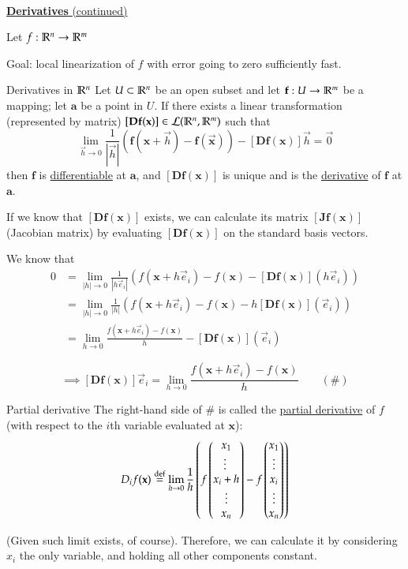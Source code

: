 \\

\ul{\textbf{Derivatives} (continued)}

Let $f : \mathbb{R}^n \rightarrow \mathbb{R}^m$

Goal: local linearization of $f$ with error going to zero sufficiently fast.

\begin{defn}{Derivatives in $\mathbb{R}^n$}
Let $U\subset \mathbb{R}^n$ be an open subset and let $\textbf{f} : U \to \mathbb{R}^m$ be a mapping; let $\bm{a}$ be a point in $U$. If there exists a linear transformation (represented by matrix) $[\textbf{Df}(\textbf{x})] \in\mathcal{L}(\mathbb{R}^n, \mathbb{R}^m)$ such that
\[\lim_{\vec{h}\rightarrow 0}\frac{1}{|\vec{h}|}(\bm{f}(\bm{x}+\vec{h})-\bm{f}(\vec{\bm{x}}))-[\bm{Df}(\bm{x})]\vec{h}=\vec{0}\]
then $\bm{f}$ is \ul{differentiable} at $\bm{a}$, and $[\bm{Df}(\bm{x})]$ is unique and is the \ul{derivative} of $\bm{f}$ at $\bm{a}$. 
\end{defn}

If we know that $[\bm{Df}(\bm{x})]$ exists, we can calculate its matrix $[\bm{Jf}(\bm{x})]$ (Jacobian matrix) by evaluating $[\bm{Df}(\bm{x})]$ on the standard basis vectors.

We know that
\begin{align*}
0 &= \lim_{|h|\rightarrow 0}\frac{1}{|h\vec{e}_i|}\left( f(\bm{x}+h\vec{e}_i)-f(\bm{x})-[\bm{Df}(\bm{x})](h\vec{e}_i) \right) \\
&= \lim_{|h|\rightarrow 0}\frac{1}{|h|}\left( f(\bm{x}+h\vec{e}_i)-f(\bm{x})-h[\bm{Df}(\bm{x})](\vec{e}_i)\right) \\
&= \lim_{h\rightarrow 0}\frac{f(\bm{x}+h\vec{e}_i)-f(\bm{x})}{h} -[\bm{Df}(\bm{x})](\vec{e}_i)
\end{align*}

\vspace{-12pt}

\[\implies [\bm{Df}(\bm{x})]\vec{e}_i = \lim_{h\rightarrow 0}\frac{f(\bm{x}+h\vec{e}_i)-f(\bm{x})}{h}\qquad (\#)\]

\begin{defn}{Partial derivative}
The right-hand side of $\#$ is called the \ul{partial derivative} of $f$ (with respect to the $i$th variable evaluated at $\bm{x}$): 
\[D_i f(\textbf{x})\overset{\mathrm{def}}{=}\lim_{h\rightarrow 0}\frac{1}{h} \left(f\begin{pmatrix} x_1  \\ \vdots\ \\ x_i + h \\ \vdots \\ x_n \end{pmatrix} - f\begin{pmatrix} x_1 \\ \vdots \\ x_i \\ \vdots \\ x_n \end{pmatrix}\right)\]

(Given such limit exists, of course). Therefore, we can calculate it by considering $x_i$ the only variable, and holding all other components constant.
\end{defn}

